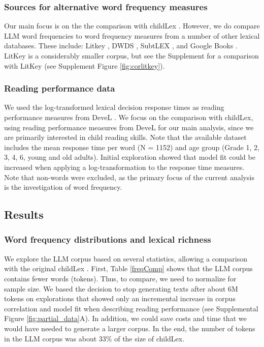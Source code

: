 \documentclass[doc, a4paper]{apa7}
\begin{document}
\subsubsection*{Sources for alternative word frequency measures}

Our main focus is on the the comparison with childLex \citep{schroeder_childlex_2015}. However, we do compare LLM word frequencies to word frequency measures from a number of other lexical databases. These include: Litkey \citep{laarmann-quante_litkey_2019}, DWDS \citep{heister_dlexdb_2011}, SubtLEX \citep{brysbaert_word_2011}, and Google Books \citep{brysbaert_impact_2016}. LitKey is a considerably smaller corpus, but see the Supplement for a comparison with LitKey (see Supplement Figure \ref{fig:corlitkey}). 


\subsubsection*{Reading performance data}

We used the log-transformed lexical decision response times as reading performance measures from DeveL \citep{schroter_developmental_2017}. We focus on the comparison with childLex, using reading performance measures from DeveL for our main analysis, since we are primarily interested in child reading skills. Note that the available dataset includes the mean response time per word (N = 1152) and age group (Grade 1, 2, 3, 4, 6, young and old adults). Initial exploration showed that model fit could be increased when applying a log-transformation to the response time measures. Note that non-words were excluded, as the primary focus of the current analysis is the investigation of word frequency.  

\subsection{Results}

\subsubsection*{Word frequency distributions and lexical richness}

We explore the LLM corpus based on several statistics, allowing a comparison with the original childLex \citep{schroeder_childlex_2015}. First, Table \ref{freqComp} shows that the LLM corpus contains fewer words (tokens). Thus, to compare, we need to normalize for sample size. We based the decision to stop generating texts after about 6M tokens on explorations that showed only an incremental increase in corpus correlation and model fit when describing reading performance (see Supplemental Figure \ref{fig:partial_data}A). In addition, we could save costs and time that we would have needed to generate a larger corpus. In the end, the number of tokens in the LLM corpus was about 33\% of the size of childLex.
\end{document}
